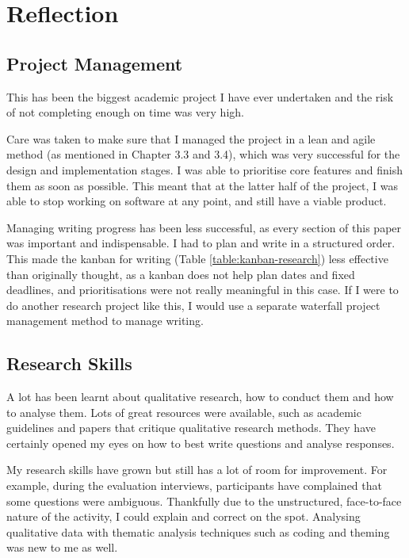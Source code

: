 \chapter{Reflection} 

\section{Project Management}

This has been the biggest academic project I have ever undertaken and 
the risk of not completing enough on time was very high.

Care was taken to make sure that I managed the project in a lean and agile method (as mentioned in Chapter 3.3 and 3.4), 
which was very successful for the design and implementation stages. 
I was able to prioritise core features and finish them as soon as possible. 
This meant that at the latter half of the project, I was able to stop working on software at any point, 
and still have a viable product.

Managing writing progress has been less successful, as every section of this paper was important and indispensable. 
I had to plan and write in a structured order. This made the kanban for writing (Table \ref{table:kanban-research}) 
less effective than originally thought, as a kanban does not help plan dates and fixed deadlines, 
and prioritisations were not really meaningful in this case. 
If I were to do another research project like this, I would use a separate waterfall project management method to manage writing.

\section{Research Skills}

A lot has been learnt about qualitative research, how to conduct them and how to analyse them.
Lots of great resources were available, such as academic guidelines and papers that critique qualitative research methods.
They have certainly opened my eyes on how to best write questions and analyse responses.

My research skills have grown but still has a lot of room for improvement. 
For example, during the evaluation interviews, participants have complained that some questions were ambiguous. 
Thankfully due to the unstructured, face-to-face nature of the activity, I could explain and correct on the spot.
Analysing qualitative data with thematic analysis techniques such as coding and theming \citep{clarke2014thematic} 
was new to me as well.

